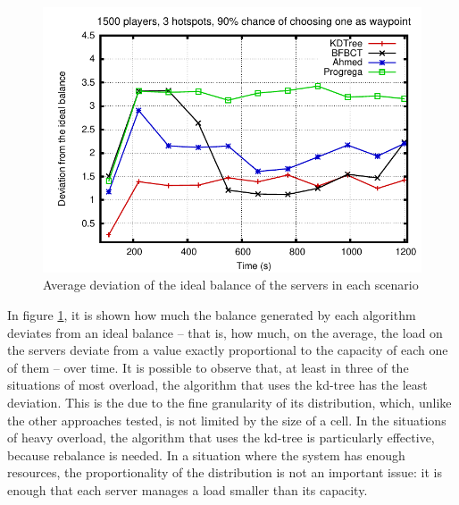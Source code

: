 \documentclass[acmjacm]{acmtrans2m}
\begin{document}
\begin{figure}[!t]
	\includegraphics[width=0.49\linewidth]{data/1500players_prob90/usagedeviation}

	\caption{Average deviation of the ideal balance of the servers in each scenario}
	\label{fig:usagedeviation}
\end{figure}

In figure \ref{fig:usagedeviation}, it is shown how much the balance generated by each algorithm deviates from an ideal balance -- that is, how much, on the average, the load on the servers deviate from a value exactly proportional to the capacity of each one of them -- over time. It is possible to observe that, at least in three of the situations of most overload, the algorithm that uses the kd-tree has the least deviation. This is the due to the fine granularity of its distribution, which, unlike the other approaches tested, is not limited by the size of a cell. In the situations of heavy overload, the algorithm that uses the kd-tree is particularly effective, because rebalance is needed. In a situation where the system has enough resources, the proportionality of the distribution is not an important issue: it is enough that each server manages a load smaller than its capacity.
\end{document}
